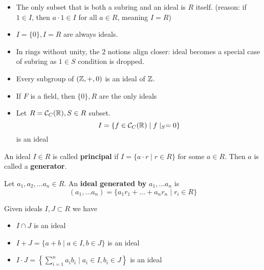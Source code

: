 \begin{rmk}\hspace{0.5cm}
    \begin{itemize}
        \item The only subset that is both a subring and an ideal is $R$ itself.
        (reason: if $1 \in I$, then $a \cdot 1 \in I$ for all $a \in R$, meaning $I = R$)
        \item $I = \{0\}, I = R$ are always ideals.
        \item In rings without unity, the 2 notions align closer: ideal becomes a special
        case of subring as $1 \in S$ condition is dropped.
    \end{itemize}
\end{rmk}
\begin{ex} \hspace{0.5cm}
    \begin{itemize}
        \item Every subgroup of $(\mathbb{Z}, +, 0)$ is an ideal of $\mathbb{Z}$.
        \item If $F$ is a field, then $\{0\}, R$ are the only ideals
        \item Let $R = \mathcal{C}_C(\mathbb{R}), S \in R$ subset.
        $$
        I = \{f \in \mathcal{C}_C(\mathbb{R}) \mid f \mid_{S} = 0 \}
        $$
        is an ideal
    \end{itemize}
\end{ex}
\begin{defn}
    An ideal $I \in R$ is called \textbf{principal} if $I = \{a \cdot r \mid r \in R\}$
    for some $a \in R$. Then $a$ is called a \textbf{generator}.
\end{defn}
\begin{defn}
    Let $a_1, a_2, \dots a_n \in R$. An \textbf{ideal generated by} $a_1, \dots a_n$ is
    $$
    (a_1, \dots a_n) = \{a_1r_1 + \dots + a_nr_n \mid r_i \in R\}
    $$
\end{defn}
\begin{fact}
    Given ideals $I, J \subset R$ we have
    \begin{itemize}
        \item $I \cap J$ is an ideal
        \item $I + J = \{a + b \mid a \in I, b \in J \}$ is an ideal
        \item $I \cdot J = \left\{\sum\limits_{i = 1}^{n}a_ib_i \mid a_i \in I, b_i \in J \right\}$ is an ideal
    \end{itemize}
\end{fact}
